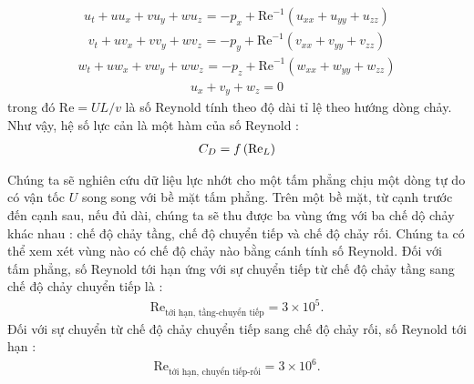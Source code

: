 \documentclass[KHI_DONG_HOC.tex]{subfiles}
\begin{document}
\begin{equation}
	\begin{aligned}
		{u_t} + u{u_x} + v{u_y} + w{u_z}_{} =  - {p_x} + \text{Re}^{-1}\left( {{u_{xx}} + {u_{yy}} + {u_{zz}}} \right)
	\end{aligned}
\end{equation}
\begin{equation}
	\begin{aligned}
		{v_t} + u{v_x} + v{v_y} + w{v_z}_{} =  - {p_y} + \text{Re}^{-1}\left( {{v_{xx}} + {v_{yy}} + {v_{zz}}} \right)
	\end{aligned}
\end{equation}
\begin{equation}
	\begin{aligned}
		{w_t} + u{w_x} + v{w_y} + w{w_z}_{} =  - {p_z} + \text{Re}^{-1}\left( {{w_{xx}} + {w_{yy}} + {w_{zz}}}\right)
	\end{aligned}
\end{equation}
\begin{equation}
	\begin{aligned}
		{u_x} + {v_y} + {w_z} = 0
	\end{aligned}
\end{equation}
trong đó $\text{Re}=UL/v$ là số Reynold tính theo độ dài tỉ lệ theo hướng dòng chảy. Như vậy, hệ số lực cản là một hàm của số Reynold :
\begin{equation}
	\begin{aligned}
		{C_D} = f\left( {{{{\mathop{\rm Re}\nolimits} }_L}} \right)
	\end{aligned}
\end{equation}

Chúng ta sẽ nghiên cứu dữ liệu lực nhớt cho một tấm phẳng chịu một dòng tự do có vận tốc $U$ song song với bề mặt tấm phẳng. Trên một bề mặt, từ cạnh trước đến cạnh sau, nếu đủ dài, chúng ta sẽ thu được ba vùng ứng với ba chế dộ chảy khác nhau : chế độ chảy tầng, chế độ chuyển tiếp và chế độ chảy rối. Chúng ta có thể xem xét vùng nào có chế độ chảy nào bằng cánh tính số Reynold. Đối với tấm phẳng, số Reynold tới hạn ứng với sự chuyển tiếp từ chế độ chảy tầng sang chế độ chảy chuyển tiếp là :
\begin{equation}
	\begin{aligned}
		\text{Re}_{\text{tới hạn, tầng-chuyển tiếp}} = 3\times 10^5.
	\end{aligned}
\end{equation}
Đối với sự chuyển từ chế độ chảy chuyển tiếp sang chế độ chảy rối, số Reynold tới hạn :
\begin{equation}
	\begin{aligned}
		\text{Re}_{\text{tới hạn, chuyển tiếp-rối}} = 3\times 10^6.
	\end{aligned}
\end{equation}
\end{document}
